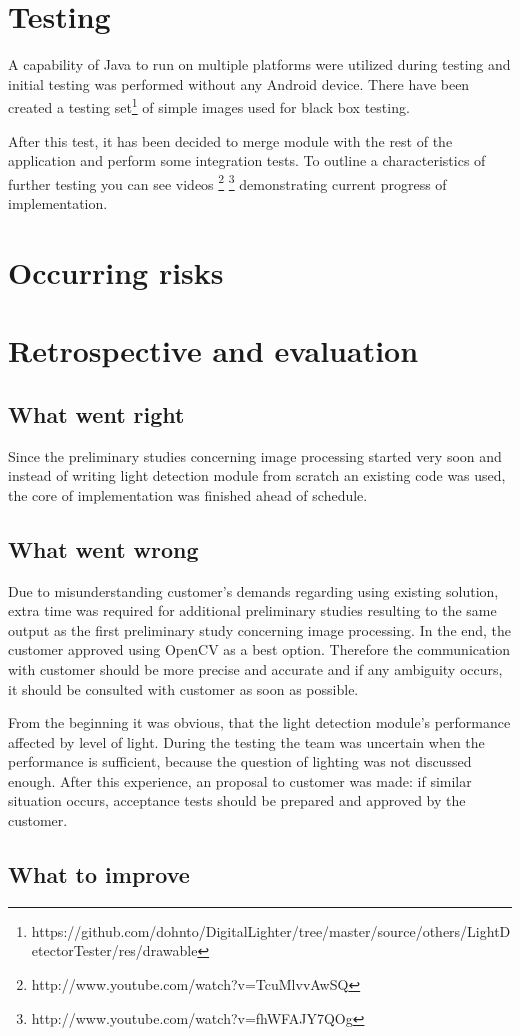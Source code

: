\section{Testing}
A capability of Java to run on multiple platforms were utilized during testing and initial testing was performed without any Android device.
There have been created a testing set\footnote{https://github.com/dohnto/DigitalLighter/tree/master/source/others/LightDetectorTester/res/drawable} of simple images used for black box testing.

After this test, it has been decided to merge module with the rest of the application and perform some integration tests.
To outline a characteristics of further testing you can see videos \footnote{http://www.youtube.com/watch?v=TcuMlvvAwSQ} \footnote{http://www.youtube.com/watch?v=fhWFAJY7QOg} demonstrating current progress of implementation.

\section{Occurring risks}
\section{Retrospective and evaluation}
\subsection{What went right}
Since the preliminary studies concerning image processing started very soon and instead of writing light detection module from scratch an existing code was used, the core of implementation was finished ahead of schedule.
\subsection{What went wrong}
Due to misunderstanding customer's demands regarding using existing solution, extra time was required for additional preliminary studies resulting to the same output as the first preliminary study concerning image processing. 
In the end, the customer approved using OpenCV as a best option.
Therefore the communication with customer should be more precise and accurate and if any ambiguity occurs, it should be consulted with customer as soon as possible.

From the beginning it was obvious, that the light detection module's performance affected by level of light.
During the testing the team was uncertain when the performance is sufficient, because the question of lighting was not discussed enough.
After this experience, an proposal to customer was made: if similar situation occurs, acceptance tests should be prepared and approved by the customer.
\subsection{What to improve}